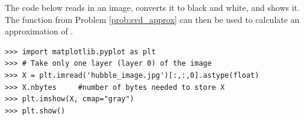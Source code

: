 The code below reads in an image, converts it to black and white, and shows it.
The function from Problem \ref{prob:svd_approx} can then be used to calculate an approximation of .
\begin{lstlisting}
>>> import matplotlib.pyplot as plt
>>> # Take only one layer (layer 0) of the image
>>> X = plt.imread('hubble_image.jpg')[:,:,0].astype(float)
>>> X.nbytes     #number of bytes needed to store X
>>> plt.imshow(X, cmap="gray")
>>> plt.show()
\end{lstlisting}


